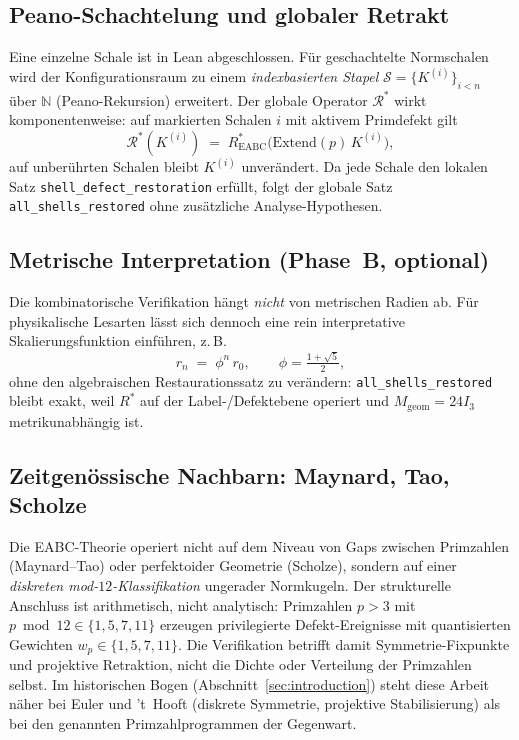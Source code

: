 \documentclass[11pt,a4paper]{article}
\begin{document}
\subsection{Peano-Schachtelung und globaler Retrakt}

Eine einzelne Schale ist in Lean abgeschlossen.
Für geschachtelte Normschalen wird der Konfigurationsraum zu einem
\emph{indexbasierten Stapel} $\mathcal{S}=\{K^{(i)}\}_{i<n}$ über
$\mathbb{N}$ (Peano-Rekursion) erweitert.
Der globale Operator $\mathcal{R}^*$ wirkt komponentenweise:
auf markierten Schalen $i$ mit aktivem Primdefekt gilt
\[
  \mathcal{R}^*(K^{(i)}) \;=\; R^*_{\mathrm{EABC}}\!\bigl(\mathrm{Extend}(p)\,K^{(i)}\bigr),
\]
auf unberührten Schalen bleibt $K^{(i)}$ unverändert.
Da jede Schale den lokalen Satz \texttt{shell\_defect\_restoration} erfüllt,
folgt der globale Satz \texttt{all\_shells\_restored} ohne zusätzliche
Analyse-Hypothesen.

\subsection{Metrische Interpretation (Phase~B, optional)}

Die kombinatorische Verifikation hängt \emph{nicht} von metrischen Radien ab.
Für physikalische Lesarten lässt sich dennoch eine rein interpretative
Skalierungsfunktion einführen, z.\,B.
\[
  r_n \;=\; \phi^n\,r_0,
  \qquad \phi=\tfrac{1+\sqrt5}{2},
\]
ohne den algebraischen Restaurationssatz zu verändern:
\texttt{all\_shells\_restored} bleibt exakt, weil $R^*$ auf der
Label-/Defektebene operiert und $M_{\mathrm{geom}}=24I_3$ metrikunabhängig ist.

\subsection{Zeitgenössische Nachbarn: Maynard, Tao, Scholze}
\label{sec:modern-neighbors}

Die EABC-Theorie operiert nicht auf dem Niveau von Gaps zwischen Primzahlen
(Maynard--Tao) oder perfektoider Geometrie (Scholze), sondern auf einer
\emph{diskreten mod-$12$-Klassifikation} ungerader Normkugeln.
Der strukturelle Anschluss ist arithmetisch, nicht analytisch:
Primzahlen $p>3$ mit $p\bmod 12\in\{1,5,7,11\}$ erzeugen privilegierte
Defekt-Ereignisse mit quantisierten Gewichten $w_p\in\{1,5,7,11\}$.
Die Verifikation betrifft damit Symmetrie-Fixpunkte und projektive Retraktion,
nicht die Dichte oder Verteilung der Primzahlen selbst.
Im historischen Bogen (Abschnitt~\ref{sec:introduction}) steht diese Arbeit
näher bei Euler und 't~Hooft (diskrete Symmetrie, projektive Stabilisierung)
als bei den genannten Primzahlprogrammen der Gegenwart.
\end{document}

